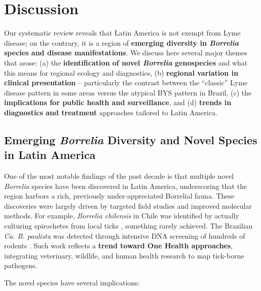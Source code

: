 \documentclass[11pt,letterpaper]{article}
\begin{document}
\section{Discussion}
Our systematic review reveals that Latin America is not exempt from Lyme disease; on the contrary, it is a region of \textbf{emerging diversity in \textit{Borrelia} species and disease manifestations}. We discuss here several major themes that arose: (a) the \textbf{identification of novel \textit{Borrelia} genospecies} and what this means for regional ecology and diagnostics, (b) \textbf{regional variation in clinical presentation} – particularly the contrast between the “classic” Lyme disease pattern in some areas versus the atypical BYS pattern in Brazil, (c) the \textbf{implications for public health and surveillance}, and (d) \textbf{trends in diagnostics and treatment} approaches tailored to Latin America.

\subsection{Emerging \textit{Borrelia} Diversity and Novel Species in Latin America}
One of the most notable findings of the past decade is that multiple novel \textit{Borrelia} species have been discovered in Latin America, underscoring that the region harbors a rich, previously under-appreciated Borrelial fauna. These discoveries were largely driven by targeted field studies and improved molecular methods. For example, \textit{Borrelia chilensis} in Chile was identified by actually culturing spirochetes from local ticks \citep{Ivanova2014f}, something rarely achieved. The Brazilian \textit{Ca. B. paulista} was detected through intensive DNA screening of hundreds of rodents \citep{Weck2022i}. Such work reflects a \textbf{trend toward One Health approaches}, integrating veterinary, wildlife, and human health research to map tick-borne pathogens.

The novel species have several implications:
\end{document}
